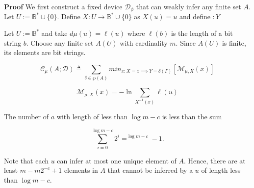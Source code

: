 \documentclass[11pt]{article}
\newcommand{\B}{\mathbb{B}}
\begin{document}
\textbf{Proof} \quad We first construct a fixed device $ \mathcal{D}_{\phi} $ that can weakly infer any finite set $ A $. Let $ U := \B^{*} \cup \{0\} $. Define $ X: U \rightarrow \B^{*} \cup \{0\} $ as $ X(u) = u $ and define $ :Y $


\bigskip
Let $ U := \B^{*} $ and take $ d\mu(u) = \ell(u) $ where $ \ell(b) $ is the length of a bit string $ b $. Choose any finite set $ A(U) $ with cardinality $ m $. Since $ A(U) $ is finite, its elements are bit strings. 

$$ \mathcal{C}_{\mu}(A ; \mathcal{D}) \triangleq \sum_{\delta \in \wp(A)} min_{x : X = x \implies Y = \delta(\Gamma) } [\mathcal{M}_{\mu, X} (x)]	$$ 

$$ \mathcal{M}_{\mu, X} (x) = - \ln \sum_{X^{-1}(x)} {\ell(u)} $$


The number of $ a $ with length of less than $ \log m - c $ is less than the sum

$$ \sum_{i = 0}^{\log m - c} {2^i} = ^{\log m - c} - 1. $$ 

Note that each $ u $ can infer at most one unique element of $ A $. Hence, there are at least $ m - m2^{-c} + 1 $ elements in $ A $ that cannot be inferred by a $ u $ of length less than $ \log m - c $. \\




\end{document}

